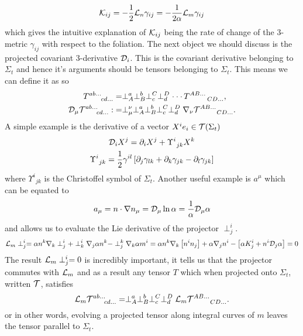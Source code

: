 \begin{equation} \mathcal{K}_{ij} = -\frac{1}{2}\mathcal{L}_n \gamma_{ij} = -\frac{1}{2\alpha}\mathcal{L}_m \gamma_{ij}\end{equation}
which gives the intuitive explanation of $\mathcal{K}_{ij}$ being the rate of change of the 3-metric $\gamma_{ij}$ with respect to the foliation. 
The next object we should discuss is the projected covariant 3-derivative $\mathcal{D}_i$. This is the covariant derivative belonging to $\Sigma_t$ and hence it's arguments should be tensors belonging to $\Sigma_t$. This means we can define it as so
\begin{align} {{T}}^{ab ...}_{\;\;\;\;\;\;\;cd ...} &=  \perp^{a}_{A}\perp^{b}_{B}\perp^{C}_{c}\perp^{D}_{d}\cdot\cdot\cdot\, T^{AB ...}_{\;\;\;\;\;\;\;\;\;\;CD ...},\\
  \mathcal{D}_\mu {{\mathcal{T}}}^{ab ...}_{\;\;\;\;\;\;\;cd ...} :&=   \perp^\nu_\mu  \perp^{a}_{A}\perp^{b}_{B}\perp^{C}_{c}\perp^{D}_{d} \nabla_\nu{\mathcal{T}}^{AB ...}_{\;\;\;\;\;\;\;\;\;\;CD ...}.\end{align}
A simple example is the derivative of a vector $X^i e_i \in \mathcal{T}(\Sigma_t)$
\begin{gather} \mathcal{D}_i X^j = \partial_i X^j + \Upsilon^i_{\;\,jk}X^k\nonumber\\
\Upsilon^i_{\;\,jk} = \frac{1}{2}\gamma^{il}\left[ \partial_{j}\gamma_{lk} + \partial_{k}\gamma_{jk} -\partial_{l}\gamma_{jk} \right]\end{gather}
where $\Upsilon^i_{\;\,jk}$ is the Christoffel symbol of $\Sigma_t$. Another useful example is $a^\mu$ which can be equated to
\begin{equation} a_\mu = n\cdot \nabla n_\mu = \mathcal{D}_\mu \ln \alpha = \frac{1}{\alpha}\mathcal{D}_\mu \alpha\end{equation}
and allows us to evaluate the Lie derivative of the projector $\perp^i_j$.
\begin{gather*}\mathcal{L}_m \perp^i_j = \alpha n^k \nabla_k \perp^i_j + \perp^i_k \nabla_j \alpha n^k - \perp^k_j \nabla_k \alpha m^i  = \alpha n^k \nabla_k \left[ n^i n_j\right]  + \alpha \nabla_j n^i - \left[ \alpha K_j^i + n^i \mathcal{D}_j \alpha\right] = 0\end{gather*}
The result $\mathcal{L}_m \perp^i_j=0$ is incredibly important, it tells us that the projector commutes with $\mathcal{L}_m$ and as a result any tensor $T$ which when projected onto $\Sigma_t$, written $\mathcal{T}$, satisfies
\begin{equation}  \mathcal{L}_m {{\mathcal{T}}}^{ab ...}_{\;\;\;\;\;\;\;cd ...} =   \perp^{a}_{A}\perp^{b}_{B}\perp^{C}_{c}\perp^{D}_{d}\mathcal{L}_m{\mathcal{T}}^{AB ...}_{\;\;\;\;\;\;\;\;\;\;CD ...}.\end{equation} 
or in other words, evolving a projected tensor along integral curves of $m$ leaves the tensor parallel to $\Sigma_t$.



